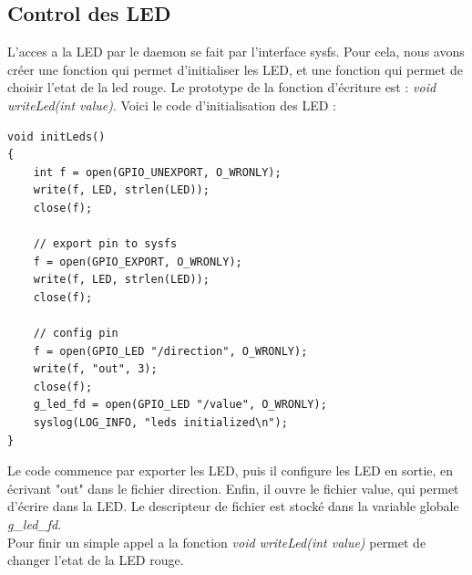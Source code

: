 \documentclass[
	a4paper, %
	10pt, %
]{CSUniSchoolLabReport}
\begin{document}
\subsection{Control des LED}\label{Leds}
L'acces a la LED par le daemon se fait par l'interface sysfs.
Pour cela, nous avons créer une fonction qui permet d'initialiser les LED, et une fonction qui permet de choisir l'etat de la led rouge.
Le prototype de la fonction d'écriture est : \textit{void writeLed(int value)}.
Voici le code d'initialisation des LED : \\
\begin{lstlisting}[style=CStyle]
void initLeds()
{
	int f = open(GPIO_UNEXPORT, O_WRONLY);
	write(f, LED, strlen(LED));
	close(f);

	// export pin to sysfs
	f = open(GPIO_EXPORT, O_WRONLY);
	write(f, LED, strlen(LED));
	close(f);

	// config pin
	f = open(GPIO_LED "/direction", O_WRONLY);
	write(f, "out", 3);
	close(f);
	g_led_fd = open(GPIO_LED "/value", O_WRONLY);
	syslog(LOG_INFO, "leds initialized\n");
}
\end{lstlisting}
Le code commence par exporter les LED, puis il configure les LED en sortie, en écrivant "out" dans le fichier direction.
Enfin, il ouvre le fichier value, qui permet d'écrire dans la LED. Le descripteur de fichier est stocké dans la variable globale \textit{g\_led\_fd}. \\
Pour finir un simple appel a la fonction \textit{void writeLed(int value)} permet de changer l'etat de la LED rouge.
\end{document}
